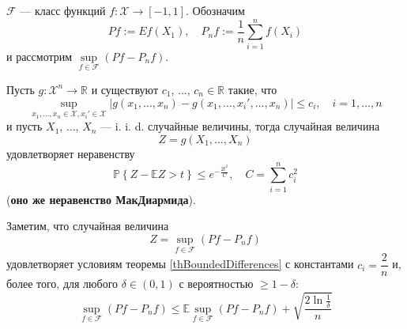 \documentclass[12pt]{article}
\newtheorem{theorem}{\hskip\parindent Теорема}%
\begin{document}
\noindent $\mathcal{F}$ --- класс функций $f:\mathscr{X}\to[-1,1]$. Обозначим
\begin{equation*}
	Pf:=Ef(X_1), \quad P_nf:=\frac{1}{n}\sum\limits_{i=1}^{n}f(X_i)
\end{equation*}
и рассмотрим $\sup\limits_{f\in\mathcal{F}}(Pf-P_nf)$.
\begin{theorem}\label{thBoundedDifferences}
	Пусть $g:\mathscr{X}^n\to\mathbb{R}$ и существуют $c_1$, $\dots$, $c_n\in\mathbb{R}$ такие, что
	\begin{equation*}
		\sup\limits_{x_1,\dots, x_n\in\mathscr{X}, x_i'\in\mathscr{X}}\left|g(x_1,\dots, x_n)-g(x_1,\dots, x_i',\dots, x_n)\right|\leqslant c_i, \quad i=1,\dots, n
	\end{equation*}
	и пусть $X_1$, $\dots$, $X_n$ --- i. i. d. случайные величины, тогда случайная величина
	\begin{equation*}
		Z=g(X_1,\dots, X_n)
	\end{equation*}
	удовлетворяет неравенству
	\begin{equation*}
		\mathbb{P}\left\{Z-\mathbb{E}Z>t\right\}\leqslant e^{-\frac{2t^2}{C}}, \quad C=\sum\limits_{i=1}^{n}c_i^2
	\end{equation*}
(\textbf{оно же неравенство МакДиармида}).
\end{theorem}

Заметим, что случайная величина
\begin{equation*}
	Z=\sup\limits_{f\in\mathcal{F}}(Pf-P_nf)
\end{equation*}
удовлетворяет условиям теоремы \ref{thBoundedDifferences} с константами $c_i=\dfrac{2}{n}$ и, более того, для любого $\delta\in(0,1)$ с вероятностью $\geqslant1-\delta$:
\begin{equation*}
	\sup\limits_{f\in\mathcal{F}}(Pf-P_nf)\leqslant\mathbb{E}\sup\limits_{f\in\mathcal{F}}(Pf-P_nf)+\sqrt{\frac{2\ln\frac{1}{\delta}}{n}}
\end{equation*}
\end{document}
